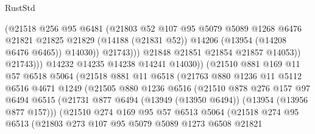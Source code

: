 \begin{lexlean}{RustStd}
\begin{coremodule}
                                (@21518
                                  @256
                                  @95
                                  @6481
                                  (@21803
                                    @52
                                    @107
                                    @95
                                    @5079
                                    @5089
                                    @1268
                                    @6476
                                    @21821
                                    @21825
                                    @21829
                                    (@14188 (@21831 @52))
                                    @14206
                                    (@13954 (@14208 @6476 @6465))
                                    @14030))
                                @21743)))
                          @21848
                          @21851
                          @21854
                          @21857
                          @14053))
                      @21743)))
                @14232
                @14235
                @14238
                @14241
                @14030))
            (@21510
              @881
              @169
              @11
              @57
              @6518
              @5064
              (@21518
                @881
                @11
                @6518
                (@21763
                  @880
                  @1236
                  @11
                  @5112
                  @6516
                  @4671
                  @1249
                  (@21505
                    @880
                    @1236
                    @6516
                    (@21510
                      @878
                      @276
                      @157
                      @97
                      @6494
                      @6515
                      (@21731 @877 @6494 (@13949 (@13950 @6494)) (@13954 (@13956 @877 @157)))
                      (@21510
                        @274
                        @169
                        @95
                        @57
                        @6513
                        @5064
                        (@21518
                          @274
                          @95
                          @6513
                          (@21803
                            @273
                            @107
                            @95
                            @5079
                            @5089
                            @1273
                            @6508
                            @21821

\end{coremodule}
\end{lexlean}
